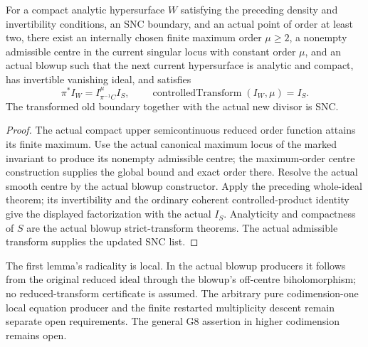 \begin{theorem}
\label{hir:fresh-max-order-blowup-strict-ideal}
\leanok
For a compact analytic hypersurface $W$ satisfying the preceding density
and invertibility conditions, an SNC boundary, and an actual point of
order at least two, there exist an internally chosen finite maximum
order $\mu\ge2$, a nonempty admissible centre in the current singular
locus with constant order $\mu$, and an actual blowup such that the
next current hypersurface is analytic and compact, has invertible
vanishing ideal, and satisfies
\[
 \pi^*I_W=I_{\pi^{-1}C}^{\mu}I_S,\qquad
 \operatorname{controlledTransform}(I_W,\mu)=I_S.
\]
The transformed old boundary together with the actual new divisor is SNC.
\end{theorem}
\begin{proof}
The actual compact upper semicontinuous reduced order function attains
its finite maximum.  Use the actual canonical maximum locus of the
marked invariant to produce its nonempty admissible centre; the
maximum-order centre construction supplies the global bound and exact
order there.  Resolve the actual smooth centre by the actual blowup
constructor.  Apply the preceding whole-ideal theorem; its
invertibility and the ordinary coherent controlled-product identity
give the displayed factorization with the actual $I_S$.
Analyticity and compactness of $S$ are the actual blowup strict-transform
theorems.  The actual admissible transform supplies the updated SNC list.
\end{proof}

The first lemma's radicality is local.  In the actual blowup producers
it follows from the original reduced ideal through the blowup's
off-centre biholomorphism; no reduced-transform certificate is assumed.
The arbitrary pure codimension-one local equation producer and the finite
restarted multiplicity descent remain separate open requirements.
The general G8 assertion in higher codimension remains open.
